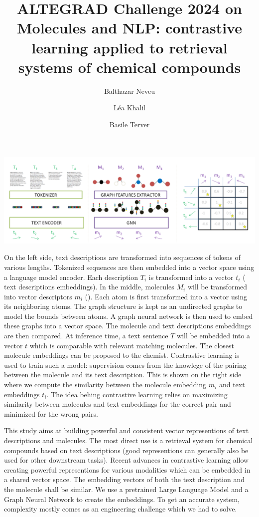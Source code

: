 \documentclass[sigconf, nonacm]{acmart}
\title{ALTEGRAD Challenge 2024 on Molecules and NLP: contrastive learning applied to retrieval systems of chemical compounds}
\author{Balthazar Neveu}
\affiliation{%
  \institution{ENS Paris-Saclay}
  \city{Saclay}
  \country{France}
}
\author{Léa Khalil}
\affiliation{%
  \institution{Ecole Polytechnique}
  \city{Palaiseau}
  \country{France}
}
\author{Basile Terver}
\affiliation{%
  \institution{Ecole Polytechnique}
  \city{Palaiseau}
  \country{France}
}
\begin{document}


  \begin{teaserfigure}
    \includegraphics[width=1.\textwidth]{figures/mol_text_overview.PNG}
    \centering
    \caption{On the left side, text descriptions are transformed into sequences of tokens of various lengths. Tokenized sequences are then embedded into a vector space using a language model encoder. Each description $T_{i}$ is transformed into a vector $t_{i}$ (\color{lime} text descriptions embeddings\color{black}). In the middle, molecules $M_{i}$ will be transformed into vector descriptors $m_{i}$ (\color{purple}{molecule embeddings}\color{black}). Each atom is first transformed into a vector using its neighboring atoms. The graph structure is kept as an undirected graphs to model the bounds between atoms. A graph neural network is then used to embed these graphs into a vector space. The molecule and text descriptions embeddings are then compared. At inference time, a text sentence $T$ will be embedded into a vector $t$ which is comparable with relevant matching molecules. The closest molecule embeddings can be proposed to the chemist. Contrastive learning is used to train such a model: supervision comes from the knowlege of the pairing between the molecule and its text description. This is shown on the right side where we compute the similarity between the molecule embedding $m_{i}$ and text embeddings $t_{i}$. The idea behing contrastive learning relies on maximizing similarity between molecules and text embeddings for the correct pair and minimized for the wrong pairs.
    }
    \label{fig:original_pipeline}
  \end{teaserfigure}
  \maketitle



This study aims at building powerful and consistent vector representions of text descriptions and molecules. The most direct use is a retrieval system for chemical compounds based on text descriptions (good representions can generally also be used for other downstream tasks). Recent advances in contrastive learning allow creating powerful representions for various modalities which can be embedded in a shared vector space. The embedding vectors of both the text description and the molecule shall be similar. We use a pretrained Large Language Model and a Graph Neural Network to create the embeddings. To get an accurate system, complexity mostly comes as an engineering challenge which we had to solve. 
\end{document}
